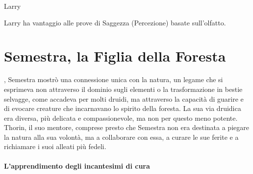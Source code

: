\documentclass[letterpaper,twocolumn,openany,nodeprecatedcode]{dndbook}
\newcommand{\Cap}[2]{\DndDropCapLine{#1}{#2}}
\begin{document}
\begin{DndMonster}[float*=b,width=\textwidth + 8pt]{Larry}
  \begin{multicols}{2}

    \DndMonsterBasics[
        armor-class = {10 (armatura naturale)},
        hit-points  = {1 (\DndDice{1d4 - 1})},
        speed       = {6m},
      ]

    \DndMonsterAbilityScores[
        str = 2,
        dex = 11,
        con = 9,
        int = 10,
        wis = 10,
        cha = 4,
      ]

    \DndMonsterDetails[
        senses = {Scurovisione 9m, Percezione Passiva 10},
        languages = {Comprende il Comune},
        challenge = 0,
      ]
     Larry ha vantaggio alle prove di Saggezza (Percezione) basate sull'olfatto.
    \DndMonsterMelee[
      name=Morso,
      type=weapon, %
      mod=+0,
      targets=one target,
      dmg=1,
      dmg-type=piercing,
    ]    
  \end{multicols}
\end{DndMonster}

\section{Semestra, la Figlia della Foresta}

\Cap{F}{in da giovane}, Semestra mostrò una connessione unica con la natura, un legame che si esprimeva non attraverso il dominio sugli elementi o la trasformazione in bestie selvagge, come accadeva per molti druidi, ma attraverso la capacità di guarire e di evocare creature che incarnavano lo spirito della foresta. La sua via druidica era diversa, più delicata e compassionevole, ma non per questo meno potente. Thorin, il suo mentore, comprese presto che Semestra non era destinata a piegare la natura alla sua volontà, ma a collaborare con essa, a curare le sue ferite e a richiamare i suoi alleati più fedeli.

\paragraph{L’apprendimento degli incantesimi di cura}
\end{document}
